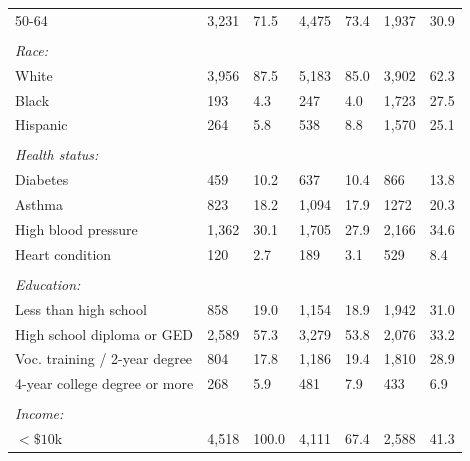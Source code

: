 \documentclass[hidelinks,12pt]{article}
\begin{document}
\begin{appendices}
\begin{singlespace}
\begin{longtable}{lllllll}
		\hspace{3mm}50-64 & 3,231 & 71.5 & 4,475 & 73.4 & 1,937 & 30.9 \\ 
		&  & & &  &  & \\ 
		\textit{Race:} &  & & &  &  & \\ 
		\hspace{3mm}White & 3,956 & 87.5 & 5,183 & 85.0 & 3,902 & 62.3  \\ 
		
		\hspace{3mm}Black & 193 & 4.3 & 247 & 4.0 & 1,723 & 27.5  \\ 
		
		\hspace{3mm}Hispanic &  264 & 5.8 & 538 & 8.8 & 1,570 & 25.1  \\ 
		&  & & &  &  & \\ 
		\textit{Health status:} &  & & &  &  & \\ 
		\hspace{3mm}Diabetes & 459 & 10.2 & 637 & 10.4 & 866 & 13.8  \\ 
		
		\hspace{3mm}Asthma & 823 & 18.2 & 1,094 & 17.9 & 1272 & 20.3   \\ 
		
		\hspace{3mm}High blood pressure & 1,362 & 30.1 & 1,705 & 27.9 & 2,166 & 34.6  \\ 
		
		\hspace{3mm}Heart condition & 120 & 2.7 & 189 & 3.1 & 529 & 8.4 \\ 
		&  & & &  &  & \\ 
		\textit{Education:} &  & & &  &  & \\  
		\hspace{3mm}Less than high school  & 858 & 19.0 & 1,154 & 18.9 & 1,942 & 31.0  \\ 
		
		\hspace{3mm}High school diploma or GED & 2,589 & 57.3 & 3,279 & 53.8 & 2,076 & 33.2   \\ 
		
		\hspace{3mm}Voc. training / 2-year degree & 804 & 17.8 & 1,186 & 19.4 & 1,810 & 28.9  \\ 
		
		\hspace{3mm}4-year college degree or more & 268 & 5.9 & 481 & 7.9 & 433 & 6.9  \\ 
		&  & & &  &  & \\ 
		\textit{Income:} &  & & &  &  & \\ 
		\hspace{3mm} $<\$10$k & 4,518 & 100.0 & 4,111 & 67.4 & 2,588 & 41.3  \\
		

\end{longtable}
\end{singlespace}
\end{appendices}
\end{document}
